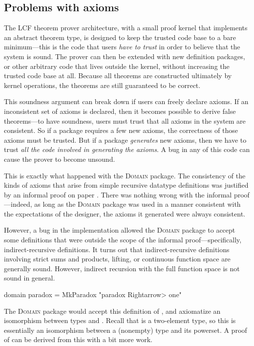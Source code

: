 \subsection{Problems with axioms}

The LCF theorem prover architecture, with a small proof kernel that implements an abstract theorem type, is designed to keep the trusted code base to a bare minimum---this is the code that users \emph{have to trust} in order to believe that the system is sound.
The prover can then be extended with new definition packages, or other arbitrary code that lives outside the kernel, without increasing the trusted code base at all. Because all theorems are constructed ultimately by kernel operations, the theorems are still guaranteed to be correct.

This soundness argument can break down if users can freely declare axioms. If an inconsistent set of axioms is declared, then it becomes possible to derive false theorems---to have soundness, users must trust that all axioms in the system are consistent. So if a package requires a few new axioms, the correctness of those axioms must be trusted. But if a package \emph{generates} new axioms, then we have to trust \emph{all the code involved in generating the axioms}. A bug in any of this code can cause the prover to become unsound.

This is exactly what happened with the  \textsc{Domain} package. The consistency of the kinds of axioms that arise from simple recursive datatype definitions was justified by an informal proof on paper \cite{Oheimb97}. There was nothing wrong with the informal proof---indeed, as long as the \textsc{Domain} package was used in a manner consistent with the expectations of the designer, the axioms it generated were always consistent.

However, a bug in the implementation allowed the \textsc{Domain} package to accept some definitions that were outside the scope of the informal proof---specifically, indirect-recursive definitions. It turns out that indirect-recursive definitions involving strict sums and products, lifting, or continuous function space are generally sound. However, indirect recursion with the full function space is not sound in general.
%
\begin{isacode}
domain paradox = MkParadox "paradox \<Rightarrow> one"
\end{isacode}
%
The  \textsc{Domain} package would accept this definition of , and axiomatize an isomorphism between types  and . Recall that  is a two-element type, so this is essentially an isomorphism between a (nonempty) type and its powerset. A proof of  can be derived from this with a bit more work.


